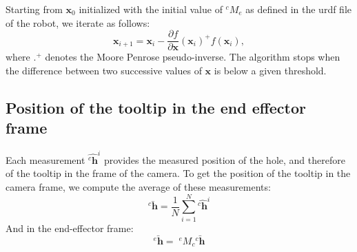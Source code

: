 \documentclass {article}
\newcommand\transf[2]{^{#1}M_{#2}}
\newcommand\x{\mathbf{x}}
\newcommand\hole{\mathbf{h}}
\begin{document}
Starting from $\x_0$ initialized with the initial value of $\transf{c}{e}$ as
defined in the urdf file of the robot, we iterate as follows:
$$
\x_{i+1} = \x_i - \frac{\partial f}{\partial \x}(\x_i)^{+}f(\x_i),
$$
where $.^{+}$ denotes the Moore Penrose pseudo-inverse. The algorithm stops when
the difference between two successive values of $\x$ is below a given threshold.

\subsection{Position of the tooltip in the end effector frame}

Each measurement $\hat{^{c}\hole}^i$ provides the measured position of the hole, and therefore of the tooltip in the frame of the camera. To get the position of the tooltip in the camera frame, we compute the average of these measurements:
$$
\bar{^{c}\hole} = \frac{1}{N}\sum_{i=1}^N \hat{^{c}\hole}^i
$$
And in the end-effector frame:
$$
\bar{^{e}\hole} =\; \transf{e}{c}\bar{^{c}\hole}
$$
\end{document}
